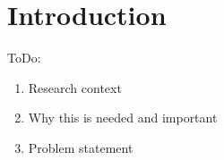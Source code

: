 \chapter{Introduction}
ToDo:

\begin{enumerate}
    \item Research context
    \item Why this is needed and important
    \item Problem statement
\end{enumerate}

